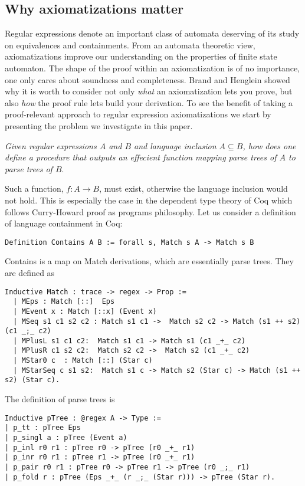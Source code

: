 \documentclass[a4paper,UKenglish,cleveref, autoref, thm-restate]{lipics-v2021}
\begin{document}
\subsection{Why axiomatizations matter}
Regular expressions denote an important class of automata deserving of its study on equivalences and containments. From an automata theoretic view, axiomatizations improve our understanding on the properties of finite state automaton. The shape of the proof within an axiomatization is of no importance, one only cares about soundness and completeness. Brand and Henglein showed why it is worth to consider not only \textit{what} an axiomatization lets you prove, but also \textit{how} the proof rule lets build your derivation. To see the benefit of taking a proof-relevant approach to regular expression axiomatizations we start by presenting the problem we investigate in this paper.\\
\begin{center}
\textit{Given regular expressions $A$ and $B$ and language inclusion $A \subseteq  B$, how does one define a procedure that outputs an effecient function mapping parse trees of $A$ to parse trees of $B$}.\\
\end{center}
Such a function, $f : A \rightarrow B$, must exist, otherwise the language inclusion would not hold. This is especially the case in the dependent type theory of Coq which follows Curry-Howard proof as programs philosophy. Let us consider a definition of language containment in Coq:
\begin{verbatim}
Definition Contains A B := forall s, Match s A -> Match s B
\end{verbatim}
\textsf{Contains} is a map on \textsf{Match} derivations, which are essentially parse trees. 
They are defined as 
\begin{verbatim}
Inductive Match : trace -> regex -> Prop :=
  | MEps : Match [::]  Eps
  | MEvent x : Match [::x] (Event x)
  | MSeq s1 c1 s2 c2 : Match s1 c1 ->  Match s2 c2 -> Match (s1 ++ s2) (c1 _;_ c2)
  | MPlusL s1 c1 c2:  Match s1 c1 -> Match s1 (c1 _+_ c2)
  | MPlusR c1 s2 c2:  Match s2 c2 ->  Match s2 (c1 _+_ c2)
  | MStar0 c  : Match [::] (Star c)
  | MStarSeq c s1 s2:  Match s1 c -> Match s2 (Star c) -> Match (s1 ++ s2) (Star c).
\end{verbatim}
The definition of parse trees is
\begin{verbatim}
Inductive pTree : @regex A -> Type := 
| p_tt : pTree Eps 
| p_singl a : pTree (Event a)
| p_inl r0 r1 : pTree r0 -> pTree (r0 _+_ r1) 
| p_inr r0 r1 : pTree r1 -> pTree (r0 _+_ r1) 
| p_pair r0 r1 : pTree r0 -> pTree r1 -> pTree (r0 _;_ r1)
| p_fold r : pTree (Eps _+_ (r _;_ (Star r))) -> pTree (Star r).
\end{verbatim}
\end{document}

